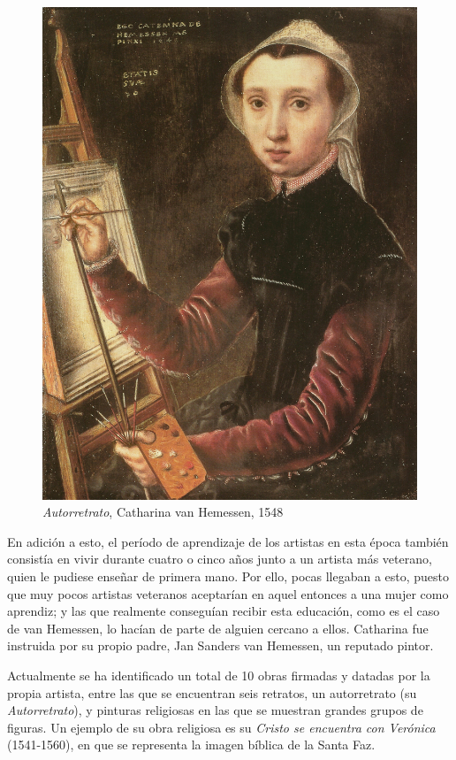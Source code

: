 \documentclass[12pt]{book}
\begin{document}
\begin{figure}
	\begin{center}
		\includegraphics[width=0.9\linewidth]{self-portrait}
		\caption{\textit{Autorretrato}, Catharina van Hemessen, 1548}
		\label{fig:wrapfig}
	\end{center}
\end{figure}

En adición a esto, el período de aprendizaje de los artistas en esta época también consistía en vivir durante cuatro o cinco años junto a un artista más veterano, quien le pudiese enseñar de primera mano. Por ello, pocas llegaban a esto, puesto que muy pocos artistas veteranos aceptarían en aquel entonces a una mujer como aprendiz; y las que realmente conseguían recibir esta educación, como es el caso de van Hemessen, lo hacían de parte de alguien cercano a ellos. Catharina fue instruida por su propio padre, Jan Sanders van Hemessen, un reputado pintor.\bigskip

Actualmente se ha identificado un total de 10 obras firmadas y datadas por la propia artista, entre las que se encuentran seis retratos, un autorretrato (su \textit{Autorretrato}), y pinturas religiosas en las que se muestran grandes grupos de figuras. Un ejemplo de su obra religiosa es su \textit{Cristo se encuentra con Verónica} (1541-1560), en que se representa la imagen bíblica de la Santa Faz.
\end{document}
